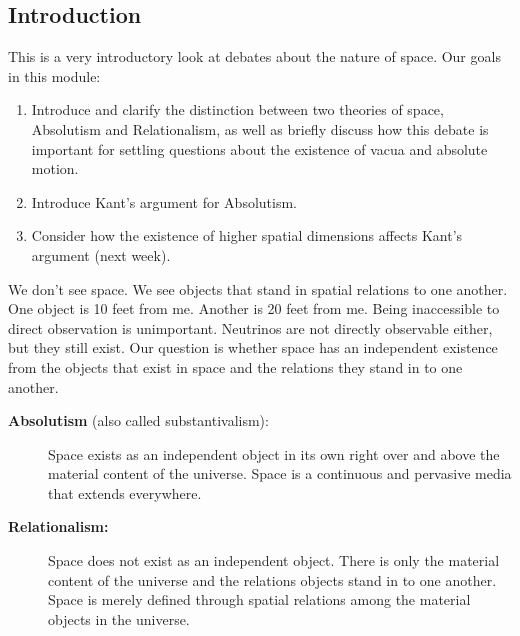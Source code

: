 \documentclass[oneside]{article}
\begin{document}
\thispagestyle{fancy}

\subsection*{Introduction}

This is a very introductory look at debates about the nature of space.
Our goals in this module:

\begin{enumerate}

\item
  Introduce and clarify the distinction between two theories of space,
  Absolutism and Relationalism, as well as briefly discuss how this
  debate is important for settling questions about the existence of
  vacua and absolute motion.
\item
  Introduce Kant's argument for Absolutism.
\item
  Consider how the existence of higher spatial dimensions affects Kant's
  argument (next week).
\end{enumerate}

We don't see space. We see objects that stand in spatial relations to
one another. One object is 10 feet from me. Another is 20 feet from me.
Being inaccessible to direct observation is unimportant. Neutrinos are
not directly observable either, but they still exist. Our question is
whether space has an independent existence from the objects that exist
in space and the relations they stand in to one another.

\begin{description}
\item[\textbf{Absolutism} (also called substantivalism):]
Space exists as an independent object in its own right over and above
the material content of the universe. Space is a continuous and
pervasive media that extends everywhere.
\item[\textbf{Relationalism:}]
Space does not exist as an independent object. There is only the
material content of the universe and the relations objects stand in to
one another. Space is merely defined through spatial relations among the
material objects in the universe.
\end{description}
\end{document}
